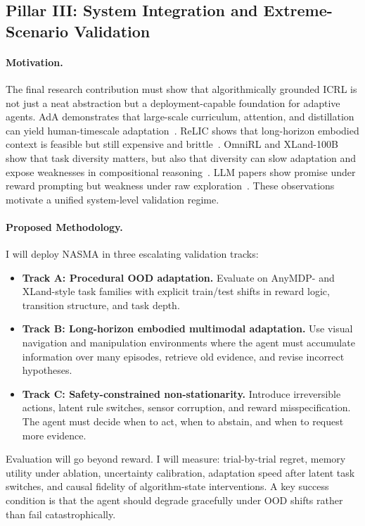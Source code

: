 \documentclass[10pt,twocolumn,letterpaper]{article}
\begin{document}
\subsection{Pillar III: System Integration and Extreme-Scenario Validation}
\paragraph{Motivation.}
The final research contribution must show that algorithmically grounded ICRL is not just a neat abstraction but a deployment-capable foundation for adaptive agents. AdA demonstrates that large-scale curriculum, attention, and distillation can yield human-timescale adaptation~\cite{adaptive2023ada}. ReLIC shows that long-horizon embodied context is feasible but still expensive and brittle~\cite{elawady2024relic}. OmniRL and XLand-100B show that task diversity matters, but also that diversity can slow adaptation and expose weaknesses in compositional reasoning~\cite{wang2025omnirl,nikulin2024xland100b}. LLM papers show promise under reward prompting but weakness under raw exploration~\cite{krishnamurthy2024explore,nie2024evolve,song2025reward}. These observations motivate a unified system-level validation regime.

\paragraph{Proposed Methodology.}
I will deploy NASMA in three escalating validation tracks:
\begin{itemize}[leftmargin=1.2em]
\item \textbf{Track A: Procedural OOD adaptation.} Evaluate on AnyMDP- and XLand-style task families with explicit train/test shifts in reward logic, transition structure, and task depth.
\item \textbf{Track B: Long-horizon embodied multimodal adaptation.} Use visual navigation and manipulation environments where the agent must accumulate information over many episodes, retrieve old evidence, and revise incorrect hypotheses.
\item \textbf{Track C: Safety-constrained non-stationarity.} Introduce irreversible actions, latent rule switches, sensor corruption, and reward misspecification. The agent must decide when to act, when to abstain, and when to request more evidence.
\end{itemize}

Evaluation will go beyond reward. I will measure: trial-by-trial regret, memory utility under ablation, uncertainty calibration, adaptation speed after latent task switches, and causal fidelity of algorithm-state interventions. A key success condition is that the agent should degrade gracefully under OOD shifts rather than fail catastrophically.
\end{document}
